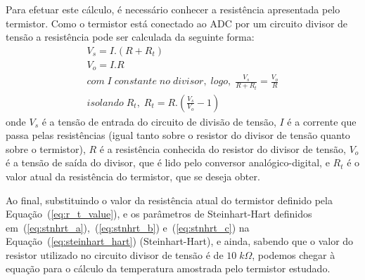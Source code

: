 Para efetuar este cálculo, é necessário conhecer a resistência apresentada pelo
termistor. Como o termistor está conectado ao ADC por um circuito divisor de
tensão a resistência pode ser calculada da seguinte forma:
\begin{eqnarray}
V_s = I.(R+R_t)\\
V_o = I.R\\
com\;I\;constante\;no\;divisor,\;logo,\; \frac{V_s}{R+R_t} =
\frac{V_o}{R}\\ \label{eq:r_t_value}isolando\;R_t,\; R_t = R.\left ( \frac{V_s}{V_o} - 1 \right)
\end{eqnarray}
onde $V_s$ é a tensão de entrada do circuito de divisão de tensão, $I$ é a
corrente que passa pelas resistências (igual tanto sobre o resistor do divisor
de tensão quanto sobre o termistor), $R$ é a resistência conhecida do resistor
do divisor de tensão, $V_o$ é a tensão de saída do divisor, que é lido pelo
conversor analógico-digital, e $R_t$ é o valor atual da resistência do
termistor, que se deseja obter.

Ao final, substituindo o valor da resistência atual do termistor definido pela
Equação~(\ref{eq:r_t_value}), e os parâmetros de Steinhart-Hart definidos
em~(\ref{eq:stnhrt_a}),~(\ref{eq:stnhrt_b}) e~(\ref{eq:stnhrt_c}) na
Equação~(\ref{eq:steinhart_hart}) (Steinhart-Hart), e ainda, sabendo que o valor
do resistor utilizado no circuito divisor de tensão é de $10\;k\Omega$,
podemos chegar à equação para o cálculo da temperatura amostrada pelo termistor
estudado.

